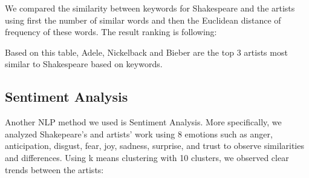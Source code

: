 \documentclass[10pt,a4paper]{article}
\begin{document}

We compared the similarity between keywords for Shakespeare and the artists using first the number of similar words and then the Euclidean distance of frequency of these words. The result ranking is following:


Based on this table, Adele, Nickelback and Bieber are the top 3 artists most similar to Shakespeare based on keywords.

\subsection{Sentiment Analysis}

Another NLP method we used is Sentiment Analysis. More specifically, we analyzed Shakepeare's and artists' work using 8 emotions such as anger, anticipation, disgust, fear, joy, sadness, surprise, and trust to observe similarities and differences. Using k means clustering with 10 clusters, we observed clear trends between the artists:
\end{document}
